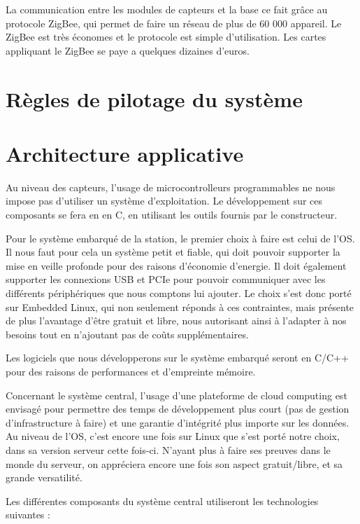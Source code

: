 La communication entre les modules de capteurs et la base ce fait grâce au protocole ZigBee, qui permet de faire un réseau de plus de 60 000 appareil. Le ZigBee est très économes et le protocole est simple d’utilisation. Les cartes appliquant le ZigBee se paye a quelques dizaines d’euros. 

\section{Règles de pilotage du système}



\section{Architecture applicative}

Au niveau des capteurs, l'usage de microcontrolleurs programmables ne nous impose pas d'utiliser un système d'exploitation. Le développement sur ces composants se fera en en C, en utilisant les outils fournis par le constructeur.

Pour le système embarqué de la station, le premier choix à faire est celui de l'OS. Il nous faut pour cela un système petit et fiable, qui doit pouvoir supporter la mise en veille profonde pour des raisons d'économie d'energie. Il doit également supporter les connexions USB et PCIe pour pouvoir communiquer avec les différents périphériques que nous comptons lui ajouter. Le choix s'est donc porté sur Embedded Linux, qui non seulement réponds à ces contraintes, mais présente de plus l'avantage d'être gratuit et libre, nous autorisant ainsi à l'adapter à nos besoins tout en n'ajoutant pas de coûts supplémentaires.

Les logiciels que nous développerons sur le système embarqué seront en C/C++ pour des raisons de performances et d'empreinte mémoire.

Concernant le système central, l'usage d'une plateforme de cloud computing est envisagé pour permettre des temps de développement plus court (pas de gestion d'infrastructure à faire) et une garantie d'intégrité plus importe sur les données. Au niveau de l'OS, c'est encore une fois sur Linux que s'est porté notre choix, dans sa version serveur cette fois-ci. N'ayant plus à faire ses preuves dans le monde du serveur, on appréciera encore une fois son aspect gratuit/libre, et sa grande versatilité.

Les différentes composants du système central utiliseront les technologies suivantes :

